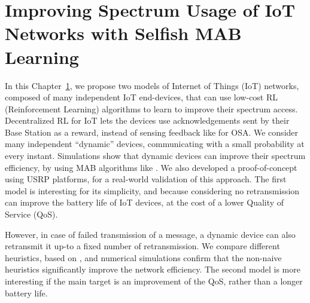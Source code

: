 
\chapter{Improving Spectrum Usage of IoT Networks with Selfish MAB Learning}
\label{chapter:4}

\graphicspath{{2-Chapters/4-Chapter/Images/}}


\abstractStartChapter{}%
%
In this Chapter~\ref{chapter:4}, we propose two models of Internet of Things (IoT) networks, composed of many independent IoT end-devices,
that can use low-cost RL (Reinforcement Learning) algorithms to learn to improve their spectrum access.
%
Decentralized RL for IoT lets the devices use acknowledgements sent by their Base Station as a reward, instead of sensing feedback like for OSA.
We consider many independent ``dynamic'' devices, communicating with a small probability at every instant.
Simulations show that dynamic devices can improve their spectrum efficiency,
by using MAB algorithms like \UCB.
We also developed a proof-of-concept using USRP platforms, for a real-world validation of this approach.
%
The first model
is interesting for its simplicity,
and because considering no retransmission can improve the battery life of IoT devices, at the cost of a lower Quality of Service (QoS).

However, in case of failed transmission of a message, a dynamic device can also retransmit it up-to a fixed number of retransmission.
We compare different heuristics, based on \UCB, and numerical simulations confirm that the non-naive heuristics significantly improve the network efficiency.
%
The second model is more interesting if the main target is an improvement of the QoS, rather than a longer battery life.

\minitocStartChapter{}

